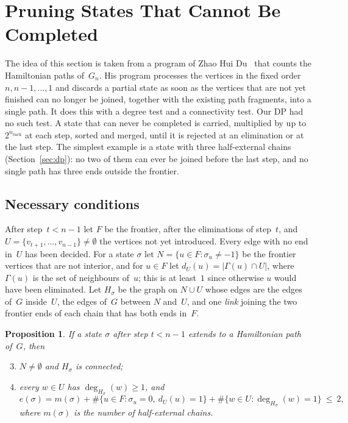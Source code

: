 \documentclass[12pt]{article}
\newtheorem{proposition}[theorem]{Proposition}
\theoremstyle{definition}
\newcommand{\Gn}{G_n}
\newcommand{\nb}{n_{\mathrm{back}}}
\begin{document}
\section{Pruning States That Cannot Be Completed}
\label{sec:prune}

The idea of this section is taken from a program of Zhao Hui
Du~\cite{DuPath4} that counts the Hamiltonian paths of~$\Gn$.
His program processes the vertices in the fixed order $n,n-1,\ldots,1$ and
discards a partial state as soon as the vertices that are not yet finished
can no longer be joined, together with the existing path fragments, into a
single path.
It does this with a degree test and a connectivity test.
Our DP had no such test.
A state that can never be completed is carried, multiplied by up to
$2^{\nb}$ at each step, sorted and merged, until it is rejected at an
elimination or at the last step.
The simplest example is a state with three half-external chains
(Section~\ref{sec:dp}): no two of them can ever be joined before the last
step, and no single path has three ends outside the frontier.

\subsection{Necessary conditions}

After step~$t<n-1$ let $F$ be the frontier, after the eliminations of
step~$t$, and $U=\{v_{t+1},\ldots,v_{n-1}\}\neq\emptyset$ the vertices not yet
introduced.
Every edge with no end in~$U$ has been decided.
For a state $\sigma$ let $N=\{u\in F:\sigma_u\neq-1\}$ be the frontier
vertices that are not interior, and for $u\in F$ let
$d_U(u)=|\Gamma(u)\cap U|$, where $\Gamma(u)$ is the set of neighbours
of~$u$; this is at least~$1$ since otherwise $u$
would have been eliminated.
Let $H_\sigma$ be the graph on $N\cup U$ whose edges are the edges of~$G$
inside~$U$, the edges of~$G$ between $N$ and~$U$, and one \emph{link}
joining the two frontier ends of each chain that has both ends in~$F$.

\begin{proposition}\label{prop:prune}
If a state $\sigma$ after step $t<n-1$ extends to a Hamiltonian path of~$G$,
then
\begin{enumerate}[nosep,label=(\Alph*)]
  \setcounter{enumi}{2}
  \item $N\neq\emptyset$ and $H_\sigma$ is connected;
  \item every $w\in U$ has $\deg_{H_\sigma}(w)\ge1$, and
  \[
    e(\sigma) = m(\sigma)
      + \#\{u\in F:\sigma_u=0,\ d_U(u)=1\}
      + \#\{w\in U:\deg_{H_\sigma}(w)=1\}\ \le\ 2,
  \]
  where $m(\sigma)$ is the number of half-external chains.
\end{enumerate}
\end{proposition}
\end{document}
